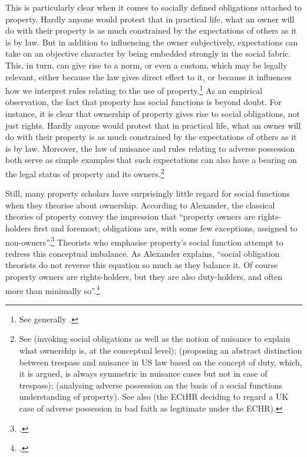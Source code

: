 {{This is particularly clear when it comes to socially defined obligations attached to property. Hardly anyone would protest that in practical life, what an owner will do with their property is as much constrained by the expectations of others as it is by law. But in addition to influencing the owner subjectively, expectations can take on an objective character by being embedded strongly in the social fabric. This, in turn, can give rise to a norm, or even a custom, which may be legally relevant, either because the law gives direct effect to it, or because it influences how we interpret rules relating to the use of property.\footnote{See generally \cite{penalver09,alexander09}.}
}
}
As an empirical observation, the fact that property has social functions is beyond doubt. For instance, it is clear that ownership of property gives rise to social obligations, not just rights. Hardly anyone would protest that in practical life, what an owner will do with their property is as much constrained by the expectations of others as it is by law. Moreover, the law of nuisance and rules relating to adverse possession both serve as simple examples that such expectations can also have a bearing on the legal status of property and its owners.\footnote{See \cite[314]{waldron85} (invoking social obligations as well as the notion of nuisance to explain what ownership is, at the conceptual level); \cite[197-198]{gerhard13} (proposing an abstract distinction between trespass and nuisance in US law based on the concept of duty, which, it is argued, is always symmetric in nuisance cases but not in case of trespass); \cite[1169-1172]{penalver07} (analysing adverse possession on the basis of a social functions understanding of property). See also \cite{pye07} (the ECtHR deciding to regard a UK case of adverse possession in bad faith as legitimate under the ECHR).}

Still, many property scholars have surprisingly little regard for social functions when they theorise about ownership. According to Alexander, the classical theories of property convey the impression that ``property owners are rights-holders first and foremost; obligations are, with some few exceptions, assigned to non-owners''.\footcite[1023]{alexander11} Theorists who emphasise property's social function attempt to redress this conceptual imbalance. As Alexander explains, ``social obligation theorists do not reverse this equation so much as they balance it. Of course property owners are rights-holders, but they are also duty-holders, and often more than minimally so''.\footnote{\cite[1023]{alexander11}.}

